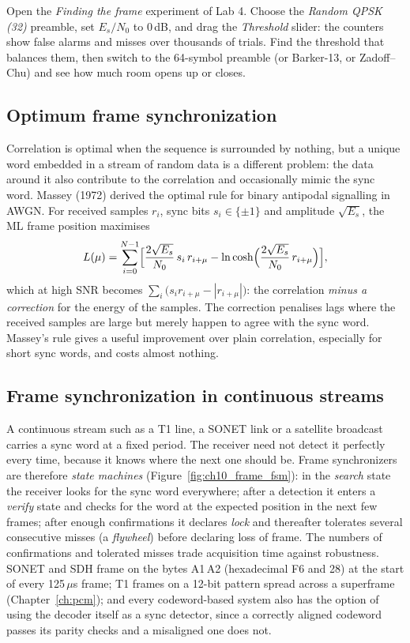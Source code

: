 \begin{tryit}
Open the \emph{Finding the frame} experiment of Lab 4. Choose the \emph{Random QPSK (32)} preamble,
set $E_s/N_0$ to 0\,dB, and drag the \emph{Threshold} slider: the counters show false alarms and
misses over thousands of trials. Find the threshold that balances them, then switch to the 64-symbol
preamble (or Barker-13, or Zadoff--Chu) and see how much room opens up or closes.
\end{tryit}

\subsection{Optimum frame synchronization}

Correlation is optimal when the sequence is surrounded by nothing, but a unique word embedded in a
stream of random data is a different problem: the data around it also contribute to the correlation
and occasionally mimic the sync word. Massey (1972) derived the optimal rule for binary antipodal
signalling in AWGN. For received samples $r_i$, sync bits $s_i\in\{\pm1\}$ and amplitude $\sqrt{E_s}$,
the ML frame position maximises
\begin{equation}
L(\mu)=\sum_{i=0}^{N-1}\Bigl[\frac{2\sqrt{E_s}}{N_0}\,s_i\,r_{i+\mu}-\ln\cosh\Bigl(\frac{2\sqrt{E_s}}{N_0}\,r_{i+\mu}\Bigr)\Bigr],
\end{equation}
which at high SNR becomes $\sum_i\bigl(s_ir_{i+\mu}-|r_{i+\mu}|\bigr)$: the correlation \emph{minus a
correction} for the energy of the samples. The correction penalises lags where the received samples
are large but merely happen to agree with the sync word. Massey's rule gives a useful improvement
over plain correlation, especially for short sync words, and costs almost nothing.

\subsection{Frame synchronization in continuous streams}

A continuous stream such as a T1 line, a SONET link or a satellite broadcast carries a sync word
at a fixed period. The receiver need not detect it perfectly every time, because it knows where the
next one should be. Frame synchronizers are therefore \emph{state machines}
(Figure~\ref{fig:ch10_frame_fsm}): in the \emph{search} state the receiver looks for the sync word
everywhere; after a detection it enters a \emph{verify} state and checks for the word at the expected
position in the next few frames; after enough confirmations it declares \emph{lock} and thereafter
tolerates several consecutive misses (a \emph{flywheel}) before declaring loss of frame. The numbers
of confirmations and tolerated misses trade acquisition time against robustness. SONET and SDH frame
on the bytes A1\,A2 (hexadecimal F6 and 28) at the start of every 125\,$\mu$s frame; T1 frames on a
12-bit pattern spread across a superframe (Chapter~\ref{ch:pcm}); and every codeword-based system also
has the option of using the decoder itself as a sync detector, since a correctly aligned codeword
passes its parity checks and a misaligned one does not.

